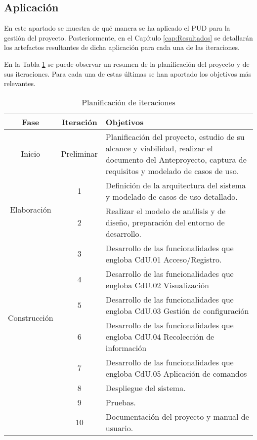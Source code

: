 \subsection{Aplicación}
\label{subsec:Aplicacion}

En este apartado se muestra de qué manera se ha aplicado el PUD para la gestión del proyecto. Posteriormente, en el Capítulo \ref{cap:Resultados} se detallarán los artefactos resultantes de dicha aplicación para cada una de las iteraciones.

En la Tabla \ref{tab:iteraciones} se puede observar un resumen de la planificación del proyecto y de sus iteraciones. Para cada una de estas últimas se han aportado los objetivos más relevantes.

\begin{table}[htb]
    \centering
    \caption{Planificación de iteraciones}
    \label{tab:iteraciones}
    \begin{tabular}[t]{ | c | c | p{8cm} |}
         \hline
         \textbf{Fase} &  \textbf{Iteración} & \textbf{Objetivos}\\
         \hline\hline
         Inicio &  Preliminar & 
         Planificación del proyecto, estudio de su alcance y viabilidad, realizar el documento del Anteproyecto, captura de requisitos y modelado de casos de uso.\\
         \hline
         \multirow{2}{*}{Elaboración}
         & 1 & Definición de la arquitectura del sistema y modelado de casos de uso detallado.\\
         \cline{2-3}
         & 2 & Realizar el modelo de análisis y de diseño, preparación del entorno de desarrollo.\\
         \hline\multirow{6}{*}{Construcción}
         & 3 & Desarrollo de las funcionalidades que engloba CdU.01 Acceso/Registro.\\
         \cline{2-3}
         & 4 & Desarrollo de las funcionalidades que engloba CdU.02 Visualización\\
         \cline{2-3}
         & 5 & Desarrollo de las funcionalidades que engloba CdU.03 Gestión de configuración\\
         \cline{2-3}
         & 6 & Desarrollo de las funcionalidades que engloba CdU.04 Recolección de información\\
         \cline{2-3}
         & 7 & Desarrollo de las funcionalidades que engloba CdU.05 Aplicación de comandos\\
         \hline
         \multirow{3}{*}{Transición}
         & 8 & Despliegue del sistema.\\
         \cline{2-3}
         & 9 & Pruebas.\\
         \cline{2-3}
         & 10 & Documentación del proyecto y manual de usuario.\\
         \hline
    \end{tabular}
\end{table}



